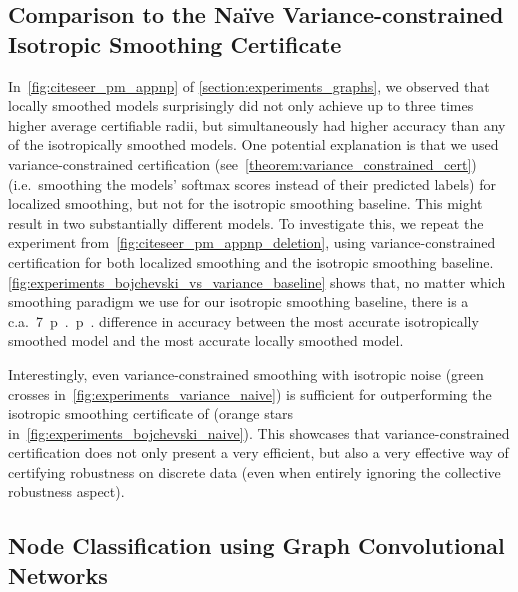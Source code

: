 \subsection{Comparison to the Na\"ive Variance-constrained Isotropic Smoothing Certificate}\label{section:naive_variance_constrained}



In~\autoref{fig:citeseer_pm_appnp} of \autoref{section:experiments_graphs}, we observed that locally smoothed models surprisingly did not only achieve up to three times higher average certifiable radii, but simultaneously had higher accuracy than any of the isotropically smoothed models.
One potential explanation is that we used variance-constrained certification (see~\autoref{theorem:variance_constrained_cert}) (i.e.~smoothing the models' softmax scores instead of their predicted labels) for localized smoothing, but not for the isotropic smoothing baseline.
This might result in two substantially different models.
To investigate this, we repeat the experiment from~\autoref{fig:citeseer_pm_appnp_deletion}, using variance-constrained certification for both localized smoothing and the isotropic smoothing baseline.
\autoref{fig:experiments_bojchevski_vs_variance_baseline} shows that, no matter which smoothing paradigm we use for our isotropic smoothing baseline, there is a c.a.\ \SI{7}{p{.}p{.}} difference in accuracy between the most accurate isotropically smoothed model and the most accurate locally smoothed model.

Interestingly, even variance-constrained smoothing with isotropic noise (green crosses in~\autoref{fig:experiments_variance_naive}) is sufficient for outperforming the isotropic smoothing certificate of \citet{Bojchevski2020} (orange stars in~\autoref{fig:experiments_bojchevski_naive}).
This showcases that variance-constrained certification does not only present a very efficient, but also a very effective way of certifying robustness on discrete data (even when entirely ignoring the collective robustness aspect).

\subsection{Node Classification using Graph Convolutional Networks}

